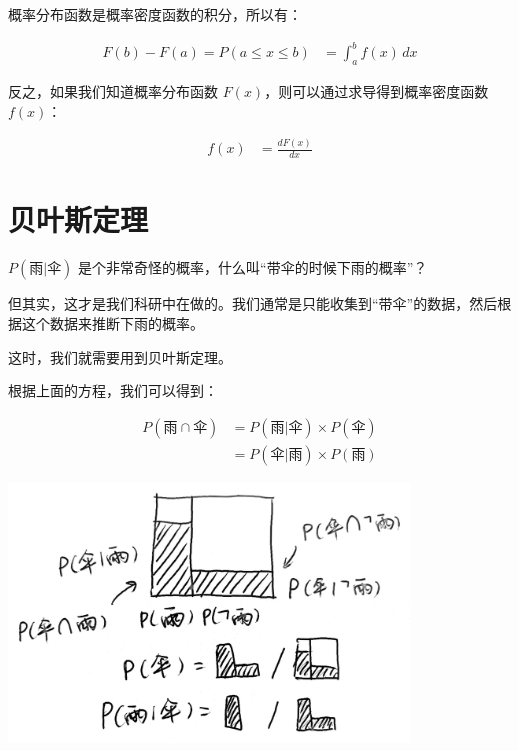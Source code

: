 \documentclass[UTF8]{ctexart}
\begin{document}
概率分布函数是概率密度函数的积分，所以有：

\begin{equation}
	\begin{aligned}
		F(b) - F(a) = P(a \leq x \leq b) & = \int_{a}^{b} f(x) \, dx
	\end{aligned}
\end{equation}

反之，如果我们知道概率分布函数 $F(x)$，则可以通过求导得到概率密度函数 $f(x)$：

\begin{equation}
	\begin{aligned}
		f(x) & = \frac{dF(x)}{dx}
	\end{aligned}
\end{equation}


\newpage
\section{贝叶斯定理}

$P(\text{雨}|\text{伞})$ 是个非常奇怪的概率，什么叫“带伞的时候下雨的概率”？

但其实，这才是我们科研中在做的。我们通常是只能收集到“带伞”的数据，然后根据这个数据来推断下雨的概率。

这时，我们就需要用到贝叶斯定理。

根据上面的方程，我们可以得到：

\begin{equation}
	\begin{aligned}
		P(\text{雨} \cap \text{伞})
		 & = P(\text{雨}|\text{伞}) \times P(\text{伞}) \\
		 & = P(\text{伞}|\text{雨}) \times P(\text{雨})
	\end{aligned}
\end{equation}

\begin{center}
	\includegraphics[width=0.8\textwidth]{fig6.jpg}
\end{center}
\end{document}
